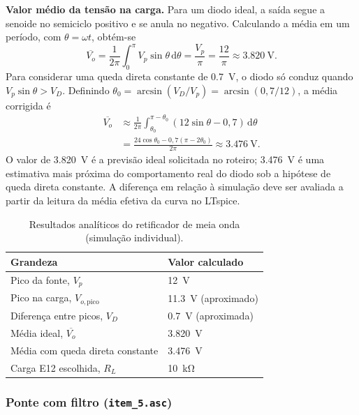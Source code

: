 \documentclass[11pt,a4paper]{article}
\begin{document}
\textbf{Valor médio da tensão na carga.}
Para um diodo ideal, a saída segue a senoide no semiciclo positivo e se
anula no negativo. Calculando a média em um período, com
$\theta=\omega t$, obtém-se
\begin{equation}
\overline{V_o}=\frac{1}{2\pi}\int_0^\pi
V_p\sin\theta\,\mathrm{d}\theta
=\frac{V_p}{\pi}=\frac{12}{\pi}
\approx\SI{3,820}{\volt}.
\end{equation}
Para considerar uma queda direta constante de \SI{0,7}{\volt}, o diodo
só conduz quando $V_p\sin\theta>V_D$. Definindo
$\theta_0=\arcsin(V_D/V_p)=\arcsin(0,7/12)$, a média corrigida é
\begin{equation}
\begin{aligned}
\overline{V_o}&\approx\frac{1}{2\pi}
\int_{\theta_0}^{\pi-\theta_0}
\left(12\sin\theta-0,7\right)\,\mathrm{d}\theta\\
&=\frac{24\cos\theta_0-0,7(\pi-2\theta_0)}{2\pi}
\approx\SI{3,476}{\volt}.
\end{aligned}
\end{equation}
O valor de \SI{3,820}{\volt} é a previsão ideal solicitada no roteiro;
\SI{3,476}{\volt} é uma estimativa mais próxima do comportamento real do
diodo sob a hipótese de queda direta constante. A diferença em relação à
simulação deve ser avaliada a partir da leitura da média efetiva da curva no
LTspice.

\begin{table}[H]
\centering
\caption{Resultados analíticos do retificador de meia onda (simulação individual).}
\label{tab:meia_onda_individual}
\begin{tabular}{@{}ll@{}}
\toprule
\textbf{Grandeza} & \textbf{Valor calculado}\\
\midrule
Pico da fonte, $V_p$ & \SI{12}{\volt}\\
Pico na carga, $V_{o,\mathrm{pico}}$ & \SI{11,3}{\volt} (aproximado)\\
Diferença entre picos, $V_D$ & \SI{0,7}{\volt} (aproximada)\\
Média ideal, $\overline{V_o}$ & \SI{3,820}{\volt}\\
Média com queda direta constante & \SI{3,476}{\volt}\\
Carga E12 escolhida, $R_L$ & \SI{10}{\kilo\ohm}\\
\bottomrule
\end{tabular}
\end{table}

\subsubsection{Ponte com filtro (\texttt{item\_5.asc})}
\end{document}
